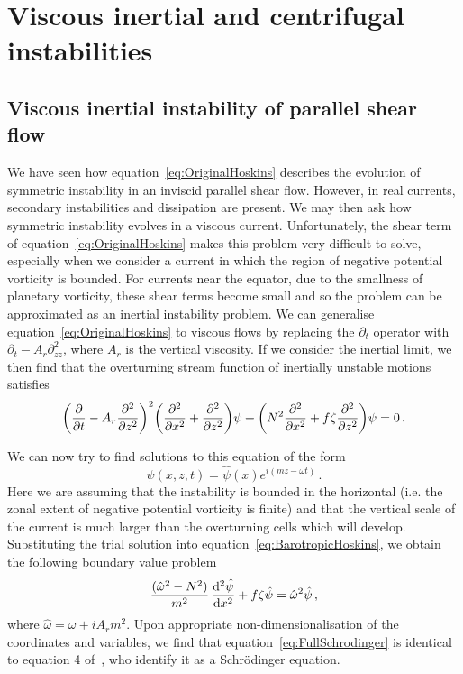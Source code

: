 \section{Viscous inertial and centrifugal instabilities}
\label{sec:ViscousSI}
\subsection{Viscous inertial instability of parallel shear flow}
We have seen how equation~\ref{eq:OriginalHoskins} describes the evolution of symmetric instability in an inviscid parallel shear flow. However, in real currents, secondary instabilities and dissipation are present. We may then ask how symmetric instability evolves in a viscous current. Unfortunately, the shear term of equation~\ref{eq:OriginalHoskins} makes this problem very difficult to solve, especially when we consider a current in which the region of negative potential vorticity is bounded. For currents near the equator, due to the smallness of planetary vorticity, these shear terms become small and so the problem can be approximated as an inertial instability problem. We can generalise equation~\ref{eq:OriginalHoskins} to viscous flows by replacing the $\partial_t$ operator with $\partial_t - A_r \partial^2_{zz}$, where $A_r$ is the vertical viscosity. If we consider the inertial limit, we then find that the overturning stream function of inertially unstable motions satisfies
\begin{equation}
    \label{eq:BarotropicHoskins}
    \bigg(\pdv{}{t} - A_r \pdv[2]{}{z} \bigg)^2 \bigg(\pdv[2]{}{x} + \pdv[2]{}{z}\bigg) \psi + \bigg( N^2 \pdv[2]{}{x} + f \zeta \pdv[2]{}{z} \bigg) \psi = 0 \, .
\end{equation}

We can now try to find solutions to this equation of the form
\begin{equation}
    \psi(x, z, t) = \hat{\psi}(x)e^{i(mz - \omega t)} \,.
\end{equation}
Here we are assuming that the instability is bounded in the horizontal (i.e. the zonal extent of negative potential vorticity is finite) and that the vertical scale of the current is much larger than the overturning cells which will develop. Substituting the trial solution into equation~\ref{eq:BarotropicHoskins}, we obtain the following boundary value problem
\begin{equation}
    \frac{(\hat{\omega}^2 - N^2 )}{m^2}\, \dv[2]{\hat{\psi}}{x} + f \zeta \hat{\psi} = \hat{\omega}^2 \hat{\psi}\, ,
    \label{eq:FullSchrodinger}
\end{equation}
where $\hat{\omega} = \omega + i A_r m^2$. Upon appropriate non-dimensionalisation of the coordinates and variables, we find that equation~\ref{eq:FullSchrodinger} is identical to equation 4 of~\citet{Plougonven2009}, who identify it as a Schr\"odinger equation.

